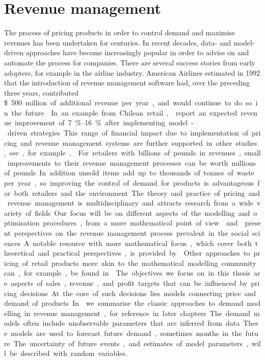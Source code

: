 \documentclass[main.tex]{subfiles}
\begin{document}
\section{Revenue management}

The process of pricing products in order to control demand and
maximise revenues has been undertaken for centuries. In recent
decades, data- and model-driven approaches have become increasingly
popular in order to advise on and automate the process for companies.
There are several success stories from early adopters, for example in
the airline industry.
American Airlines estimated in 1992 that the introduction of revenue
management software had, over the preceding three
years, contributed \SI{500}[\$] million of additional revenue per year,
and would continue to do so in the future \citep{smith1992yield}.
In an example from Chilean retail, \citet{bitran1998coordinating}
report an expected revenue improvement of \SIrange{7}{16}{\percent} after implementing
model-driven strategies.
This range of financial impact due to implementation of pricing and revenue
management systems are further supported in other studies, see, for example, \citet[Ch.~1.2]{phillips2005pricing}.
For retailers with billions of pounds in revenues, small
improvements to their revenue management processes can be worth millions
of pounds.
In addition unsold items add up to thousands of tonnes of waste per year, so
improving the control of demand for products is advantageous
for both retailers and the environment.

The theory and practice of pricing and revenue management is
multidisciplinary and attracts research from a wide variety of
fields. Our focus will be on different aspects of the modelling and
optimisation procedures, from a more mathematical point of view.
\citet{phillips2005pricing} and \citet{ozer2012oxford} present perspectives on the
revenue management process prevalent in the social sciences.
A notable resource with more mathematical focus, which
cover both theoretical and practical
perspectives, is provided by \citet{talluri2006theory}.
Other approaches to pricing of retail products more akin to the
mathematical modelling community can, for example, be found
in \citet{butler2014customer}.

The objectives we focus on in this thesis are aspects of sales,
revenue, and profit targets that can be influenced by pricing
decisions.  At the core of such decisions lies models connecting price
and demand of products.  In  we summarise
the classic approaches to demand modelling in revenue management, for
reference in later chapters.  The demand models often include
unobservable parameters that are inferred from data.  These models are
used to forecast future demand, sometimes months in the future.  The
uncertainty of future events, and estimates of model parameters, will
be described with random variables.
\end{document}
